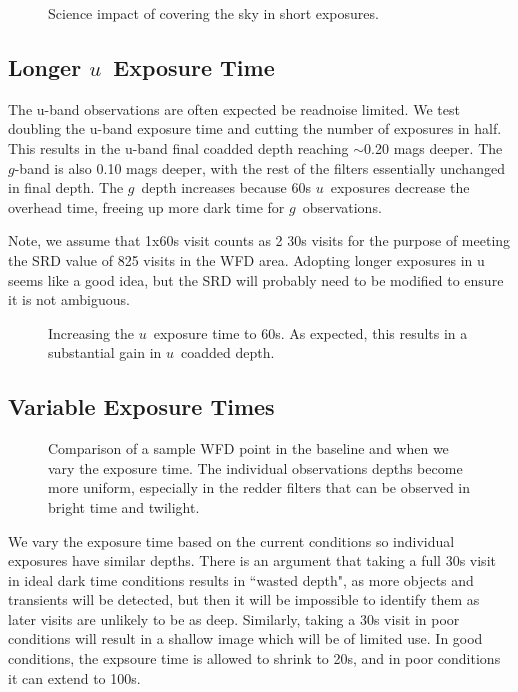 \begin{figure}
\caption{Science impact of covering the sky in short exposures. }
\end{figure}


\subsection{Longer $u$\ Exposure Time}\label{ss:u60}

The u-band observations are often expected be readnoise limited. We test doubling the u-band exposure time and cutting the number of exposures in half. This results in the u-band final coadded depth reaching $\sim$0.20 mags deeper. The $g$-band is also 0.10 mags deeper, with the rest of the filters essentially unchanged in final depth. The $g$\ depth increases because 60s $u$\ exposures decrease the overhead time, freeing up more dark time for $g$\ observations.

Note, we assume that 1x60s visit counts as 2 30s visits for the purpose of meeting the SRD value of 825 visits in the WFD area. Adopting longer exposures in u seems like a good idea, but the SRD will probably need to be modified to ensure it is not ambiguous.

\begin{figure}
\caption{Increasing the $u$\ exposure time to 60s.  As expected, this results in a substantial gain in $u$\ coadded depth.}
\end{figure}

\subsection{Variable Exposure Times}

\begin{figure}
\caption{Comparison of a sample WFD point in the baseline and when we vary the exposure time. The individual observations depths become more uniform, especially in the redder filters that can be observed in bright time and twilight.}\label{fig:varexptime}
\end{figure}

We vary the exposure time based on the current conditions so individual exposures have similar depths. There is an argument that taking a full 30s visit in ideal dark time conditions results in ``wasted depth", as more objects and transients will be detected, but then it will be impossible to identify them as later visits are unlikely to be as deep. Similarly, taking a 30s visit in poor conditions will result in a shallow image which will be of limited use. In good conditions, the expsoure time is allowed to shrink to 20s, and in poor conditions it can extend to 100s.

